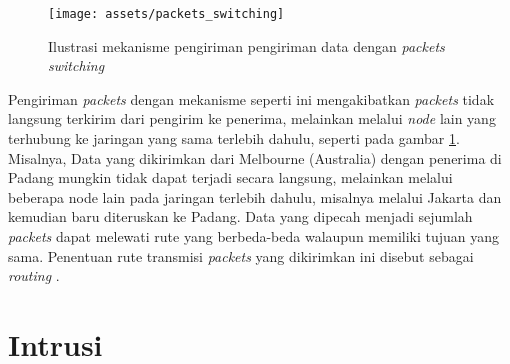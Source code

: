 \documentclass[a4paper,12pt]{report}
\begin{document}
\begin{figure}[H]
	\center \texttt{[image: assets/packets\_switching]}
	\caption{Ilustrasi mekanisme pengiriman pengiriman data dengan \textit{packets switching}} 
	\label{packets_switching}
\end{figure}

Pengiriman \textit{packets} dengan mekanisme seperti ini mengakibatkan \textit{packets} tidak langsung terkirim dari pengirim ke penerima, melainkan melalui \textit{node} lain yang terhubung ke jaringan yang sama terlebih dahulu, seperti pada gambar \ref{packets_switching}. Misalnya, Data yang dikirimkan dari Melbourne (Australia) dengan penerima di Padang mungkin tidak dapat terjadi secara langsung, melainkan melalui beberapa node lain pada jaringan terlebih dahulu, misalnya melalui Jakarta dan kemudian baru diteruskan ke Padang. Data yang dipecah menjadi sejumlah \textit{packets} dapat melewati rute yang berbeda-beda walaupun memiliki tujuan yang sama. Penentuan rute transmisi \textit{packets} yang dikirimkan ini disebut sebagai \textit{routing} \cite{tanenbaumComputerNetworks2011}.

\section{Intrusi}
\end{document}
